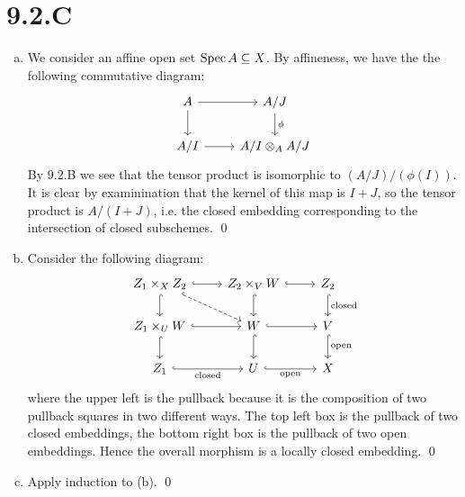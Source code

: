 \documentclass{article}
\begin{document}
\section{9.2.C}
\begin{enumerate}[a.]
    \item We consider an affine open set $\operatorname{Spec} A \subseteq X$. By affineness, we have
          the the following commutative diagram: \[\begin{tikzcd}
                  A                             & {A/J}
                  \\{A/I} & {A/I \otimes_A A/J}
                  \arrow[from=1-1, to=2-1] \arrow[from=2-1, to=2-2] \arrow[from=1-1, to=1-2]
                  \arrow["\phi", from=1-2, to=2-2]
              \end{tikzcd}\] By 9.2.B we see
          that the tensor product is isomorphic to $(A/J)/(\phi(I))$. It is clear by
          examinination that the kernel of this map is $I+J$, so the
          tensor product is $A/(I+J)$, i.e. the closed embedding
          corresponding to the intersection of closed subschemes. \qed
    \item Consider the following diagram: \[\begin{tikzcd}
                  {Z_1\times_XZ_2}                       & {Z_2\times_VW} &
                  {Z_2}
                  \\{Z_1\times_UW} & W              & V
                  \\{Z_1}          & U              & X
                  \arrow["{\text{open}}", hook, from=2-3, to=3-3]
                  \arrow["{\text{closed}}", hook, from=1-3, to=2-3]
                  \arrow["{\text{open}}"', hook, from=3-2, to=3-3]
                  \arrow["{\text{closed}}"', hook, from=3-1, to=3-2]
                  \arrow[hook, from=2-2, to=3-2]
                  \arrow[hook, from=2-2, to=2-3]
                  \arrow[hook, from=1-2, to=1-3]
                  \arrow[hook, from=1-2, to=2-2]
                  \arrow[hook, from=2-1, to=3-1]
                  \arrow[hook, from=2-1, to=2-2]
                  \arrow[hook, from=1-1, to=2-1]
                  \arrow[hook, from=1-1, to=1-2]
                  \arrow[dashed, hook, from=1-1, to=2-2]
              \end{tikzcd}\] where the upper left is
          the pullback because it is the composition of two pullback squares in two
          different ways. The top left box is the pullback of two closed embeddings, the
          bottom right box is the pullback of two open embeddings. Hence the overall
          morphism is a locally closed embedding. \qed
    \item Apply induction to (b). \qed
\end{enumerate}
\end{document}
